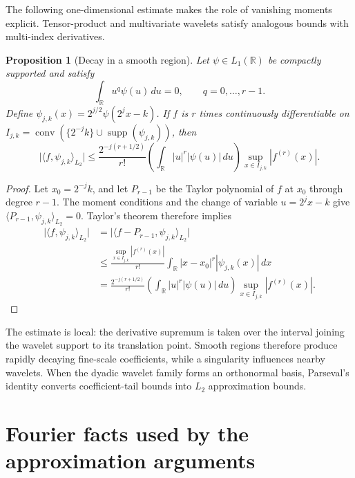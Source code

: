 \documentclass[11pt,twoside]{article}
\newcommand{\R}{\mathbb R}
\newtheorem{proposition}[theorem]{Proposition}
\theoremstyle{definition}
\theoremstyle{remark}
\begin{document}
The following one-dimensional estimate makes the role of vanishing moments
explicit. Tensor-product and multivariate wavelets satisfy analogous bounds
with multi-index derivatives.

\begin{proposition}[Decay in a smooth region]
\label{prop:wavelet-coefficient-decay}
Let $\psi\in L_1(\R)$ be compactly supported and satisfy
\begin{equation}
 \int_{\R}u^q\psi(u)\,du=0,
 \qquad q=0,\ldots,r-1.
 \label{eq:one-dimensional-moments}
\end{equation}
Define $\psi_{j,k}(x)=2^{j/2}\psi(2^jx-k)$. If $f$ is $r$ times
continuously differentiable on
$I_{j,k}=\operatorname{conv}(\{2^{-j}k\}\cup
\operatorname{supp}(\psi_{j,k}))$, then
\begin{equation}
 \bigl|\langle f,\psi_{j,k}\rangle_{L_2}\bigr|
 \leq
 \frac{2^{-j(r+1/2)}}{r!}
 \left(\int_{\R}|u|^r|\psi(u)|\,du\right)
 \sup_{x\in I_{j,k}}|f^{(r)}(x)|.
 \label{eq:wavelet-coefficient-decay}
\end{equation}
\end{proposition}

\begin{proof}
Let $x_0=2^{-j}k$, and let $P_{r-1}$ be the Taylor polynomial of $f$ at
$x_0$ through degree $r-1$. The moment conditions and the change of variable
$u=2^jx-k$ give
$\langle P_{r-1},\psi_{j,k}\rangle_{L_2}=0$. Taylor's theorem therefore
implies
\begin{align*}
 \bigl|\langle f,\psi_{j,k}\rangle_{L_2}\bigr|
 &=\bigl|\langle f-P_{r-1},\psi_{j,k}\rangle_{L_2}\bigr|\\
 &\leq
 \frac{\sup_{x\in I_{j,k}}|f^{(r)}(x)|}{r!}
 \int_{\R}|x-x_0|^r|\psi_{j,k}(x)|\,dx\\
 &=\frac{2^{-j(r+1/2)}}{r!}
 \left(\int_{\R}|u|^r|\psi(u)|\,du\right)
 \sup_{x\in I_{j,k}}|f^{(r)}(x)|.
\end{align*}
\end{proof}

The estimate is local: the derivative supremum is taken over the interval
joining the wavelet support to its translation point. Smooth regions
therefore produce rapidly decaying fine-scale coefficients, while a
singularity influences nearby wavelets. When the dyadic wavelet family forms
an orthonormal basis, Parseval's identity converts coefficient-tail bounds
into $L_2$ approximation bounds.

\section{Fourier facts used by the approximation arguments}
\label{app:fourier-basics}
\end{document}
